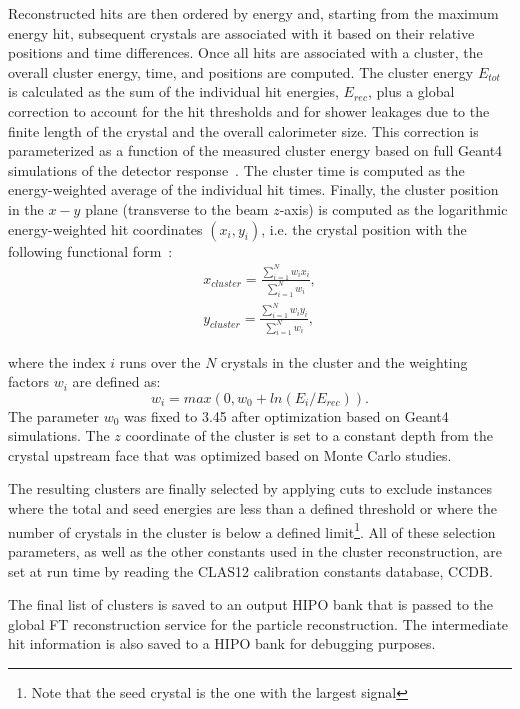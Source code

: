 Reconstructed hits are then ordered by energy and, starting from the maximum energy hit, subsequent crystals
are associated with it based on their relative positions and time differences. Once all hits are associated with a
cluster, the overall cluster energy, time, and positions are computed. The cluster energy $E_{tot}$ is calculated as
the sum of the individual hit energies, $E_{rec}$, plus a global correction to account for the hit thresholds and for
shower leakages due to the finite length of the crystal and the overall calorimeter size. This correction is
parameterized as a function of the measured cluster energy based on full Geant4 simulations of the detector
response~\cite{ft-nim}. The cluster time is computed as the energy-weighted average of the individual hit times.
Finally, the cluster position in the $x-y$ plane (transverse to the beam $z$-axis) is computed as the logarithmic
energy-weighted hit coordinates $(x_i,y_i)$, i.e. the crystal position with the following functional form~\cite{ic}:
\begin{eqnarray}
x_{cluster} = \frac{\sum_{i=1}^N w_i x_i}{\sum_{i=1}^N w_i},\\
y_{cluster} = \frac{\sum_{i=1}^N w_i y_i}{\sum_{i=1}^N w_i},\nonumber
\end{eqnarray}

\noindent
where the index $i$ runs over the $N$ crystals in the cluster and the weighting factors $w_i$ are defined as:
\begin{equation}
w_i=max\left(0,w_0+ln(E_i/E_{rec}) \right).
\end{equation}
\noindent
The parameter $w_0$ was fixed to 3.45 after optimization based on Geant4 simulations. The $z$ coordinate of
the cluster is set to a constant depth from the crystal upstream face that was optimized based on Monte Carlo
studies.

The resulting clusters are finally selected by applying cuts to exclude instances where the total and seed energies
are less than a defined threshold or where the number of crystals in the cluster is below a defined
limit\footnote{Note that the seed crystal is the one with the largest signal}. All of these selection parameters, as
well as the other constants used in the cluster reconstruction, are set at run time by reading the CLAS12 calibration
constants database, CCDB.

The final list of clusters is saved to an output HIPO bank that is passed to the global FT reconstruction service for
the particle reconstruction. The intermediate hit information is also saved to a HIPO bank for debugging purposes.

